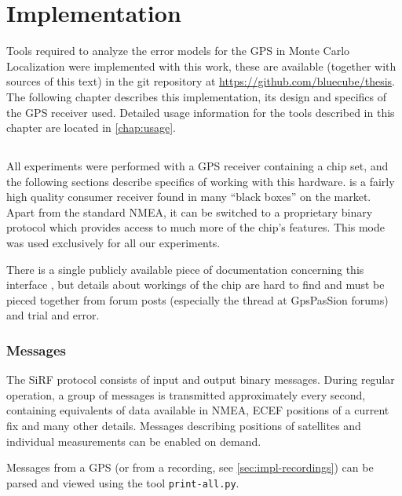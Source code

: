 \chapter{Implementation}
\label{chap:implementation}

Tools required to analyze the error models for the GPS in Monte Carlo Localization
were implemented with this work, these are
available (together with sources of this text) in the git repository at
\url{https://github.com/bluecube/thesis}.
The following chapter describes this implementation, its design and
specifics of the GPS receiver used.
Detailed usage information for the tools described in this chapter are located in
\cref{chap:usage}.

\section{\sirf}
\label{sec:impl-sirf}

All experiments were performed with a GPS receiver containing
a \sirf chip set, and the following sections describe specifics of working with
this hardware.
\sirf is a fairly high quality consumer receiver found in many
\enquote{black boxes} on the market.
Apart from the standard NMEA, it can be switched to a proprietary binary protocol
which provides access to much more of the chip's features.
This mode was used exclusively for all our experiments.

There is a single publicly available piece of documentation concerning this
interface \cite{sirf-protocol}, but details about workings of the chip are hard
to find and must be pieced together from forum posts (especially the thread
\cite{gpspassion-sirf} at GpsPasSion forums) and trial and error.

\subsection{Messages}
The SiRF protocol consists of input and output binary messages.
During regular operation, a group of messages is transmitted approximately every second,
containing equivalents of data available in NMEA, ECEF positions of a current
fix and many other details.
Messages describing positions of satellites and individual measurements can be
enabled on demand.

Messages from a GPS (or from a recording, see \cref{sec:impl-recordings}) can be
parsed and viewed using the tool \verb=print-all.py=.

